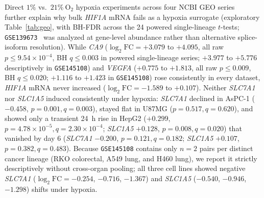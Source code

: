 \documentclass[11pt]{article}
\begin{document}
Direct $1\%$ vs.\ $21\%\ \text{O}_2$ hypoxia experiments across four NCBI GEO series~\cite{gse139673,gse145108,gse283995,gse300765} further explain why bulk \textit{HIF1A} mRNA fails as a hypoxia surrogate (exploratory Table~\ref{tab:geo}, with BH-FDR across the 24 powered single-lineage $t$-tests; \texttt{GSE139673}~\cite{gse139673} was analyzed at gene-level abundance rather than alternative splice-isoform resolution). While \textit{CA9} ($\log_2\text{FC} = +3.079$ to $+4.095$, all raw $p \le 9.54 \times 10^{-4}$, BH $q \le 0.003$ in powered single-lineage series; $+3.977$ to $+5.776$ descriptively in \texttt{GSE145108}) and \textit{VEGFA} ($+0.775$ to $+1.813$, all raw $p \le 0.009$, BH $q \le 0.020$; $+1.116$ to $+1.423$ in \texttt{GSE145108}) rose consistently in every dataset, \textit{HIF1A} mRNA never increased ($\log_2\text{FC} = -1.589$ to $+0.107$). Neither \textit{SLC7A1} nor \textit{SLC1A5} induced consistently under hypoxia: \textit{SLC7A1} declined in AsPC-1 ($-0.458$, $p = 0.001, q = 0.003$), stayed flat in U87MG ($p = 0.517, q = 0.620$), and showed only a transient 24~h rise in HepG2 ($+0.299$, $p = 4.78 \times 10^{-5}, q = 2.30 \times 10^{-4}$; \textit{SLC1A5} $+0.128$, $p = 0.008, q = 0.020$) that vanished by day 6 (\textit{SLC7A1} $-0.200$, $p = 0.121, q = 0.182$; \textit{SLC1A5} $+0.107$, $p = 0.382, q = 0.483$). Because \texttt{GSE145108} contains only $n = 2$ pairs per distinct cancer lineage (RKO colorectal, A549 lung, and H460 lung), we report it strictly descriptively without cross-organ pooling; all three cell lines showed negative \textit{SLC7A1} ($\log_2\text{FC} = -0.254$, $-0.716$, $-1.367$) and \textit{SLC1A5} ($-0.540$, $-0.946$, $-1.298$) shifts under hypoxia.
\end{document}
